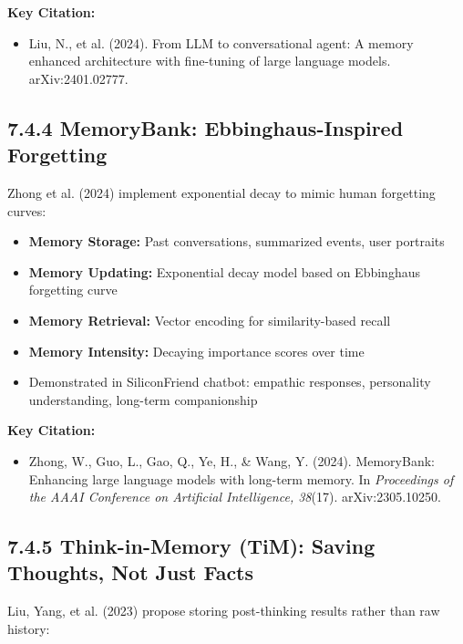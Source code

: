 \documentclass[11pt,letterpaper]{article}
\begin{document}
\textbf{Key Citation:}
\begin{itemize}[leftmargin=*]
    \item Liu, N., et al. (2024). From LLM to conversational agent: A memory enhanced architecture with fine-tuning of large language models. arXiv:2401.02777.
\end{itemize}

\subsection{7.4.4 MemoryBank: Ebbinghaus-Inspired Forgetting}

Zhong et al. (2024) implement exponential decay to mimic human forgetting curves:

\begin{itemize}[leftmargin=*]
    \item \textbf{Memory Storage:} Past conversations, summarized events, user portraits
    \item \textbf{Memory Updating:} Exponential decay model based on Ebbinghaus forgetting curve
    \item \textbf{Memory Retrieval:} Vector encoding for similarity-based recall
    \item \textbf{Memory Intensity:} Decaying importance scores over time
    \item Demonstrated in SiliconFriend chatbot: empathic responses, personality understanding, long-term companionship
\end{itemize}

\textbf{Key Citation:}
\begin{itemize}[leftmargin=*]
    \item Zhong, W., Guo, L., Gao, Q., Ye, H., \& Wang, Y. (2024). MemoryBank: Enhancing large language models with long-term memory. In \textit{Proceedings of the AAAI Conference on Artificial Intelligence, 38}(17). arXiv:2305.10250.
\end{itemize}

\subsection{7.4.5 Think-in-Memory (TiM): Saving Thoughts, Not Just Facts}

Liu, Yang, et al. (2023) propose storing post-thinking results rather than raw history:
\end{document}
